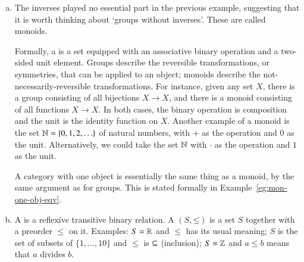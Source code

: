 \begin{examples}
\begin{enumerate}[(b)]
To see this, suppose that your education had been shuffled and that you
already knew about categories before being taught about groups.  In your
first group theory class, the lecturer declares that a group is supposed to
be the system of all symmetries of an object.  A symmetry of an object $X$,
she says, is a way of mapping $X$ to itself in a reversible or invertible
manner.  At this point, you realize that she is talking about a very
special type of category.  In general, a category is a system consisting of
\emph{all} the mappings (not usually just the invertible ones) between
\emph{many} objects (not usually just one).  So a group is just a category
with the special properties that all the maps are invertible and there is
only one object.

\item
\label{eg:cats-as:monoids}
The inverses played no essential part in the previous example, suggesting that
it is worth thinking about `groups without inverses'.  These are called
monoids.

Formally, a %
%
%
is a set equipped with an associative binary operation and a two-sided unit
element.  Groups describe the reversible transformations, or symmetries,
that can be applied to an object; monoids describe the
not-necessarily-reversible transformations.  For instance, given any set
$X$, there is a group consisting of all bijections $X \to X$, and there is
a monoid consisting of all functions $X \to X$.  In both cases, the binary
operation is composition and the unit is the identity function on $X$.
Another example of a monoid is the set $\mathbb{N} = \{0, 1, 2, \ldots\}$%
%
%
of natural%
%
%
numbers, with $+$ as the operation and $0$ as the unit.  Alternatively, we
could take the set $\mathbb{N}$ with $\cdot$ as the operation and $1$ as the
unit.

A category with one%
%
%
object is essentially the same thing as a monoid, by the same argument as
for groups.  This is stated formally in Example~\ref{eg:mon-one-obj-eqv}.%
%
%

\item
\label{eg:cats-as:orders}
A %
%
%
is a reflexive transitive binary relation.  A  $(S,
\mathord{\leq})$%
%
%
is a set $S$ together with a preorder $\leq$ on it.  Examples: $S = \mathbb{R}$
and $\leq$ has its usual meaning; $S$ is the set of subsets of $\{1,
\ldots, 10\}$ and $\leq$ is $\subseteq$ (inclusion); $S = \mathbb{Z}$ and $a \leq
b$ means that $a$ divides $b$.


\end{enumerate}
\end{examples}
